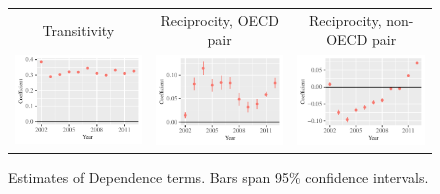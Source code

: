 \documentclass[reqno,onecolumn,letterpaper,12pt]{article}
\begin{document}
{\begin{figure}[!h]
\centering
\begin{tabular}{@{\hskip -.05cm}c@{\hskip .1cm}c@{\hskip .1cm}c}
Transitivity  & Reciprocity, OECD pair &Reciprocity, non-OECD pair\\
\includegraphics[height=.16\textheight, clip=true, trim=.5cm .5cm .25cm .1cm]{SI_figures/EU_rl_plots/Transitivity.pdf}   &
\includegraphics[height=.16\textheight, clip=true, trim=.5cm .5cm .25cm .1cm]{SI_figures/EU_rl_plots/Mutuality_OECD.pdf}    &
\includegraphics[height=.16\textheight, clip=true, trim=.5cm .5cm .25cm .1cm]{SI_figures/EU_rl_plots/Mutuality_notOECD.pdf} \\
\end{tabular}
\caption{\label{fig:EU_netterms} Estimates of Dependence terms. Bars span 95\% confidence intervals. }
\end{figure}

}
\end{document}
